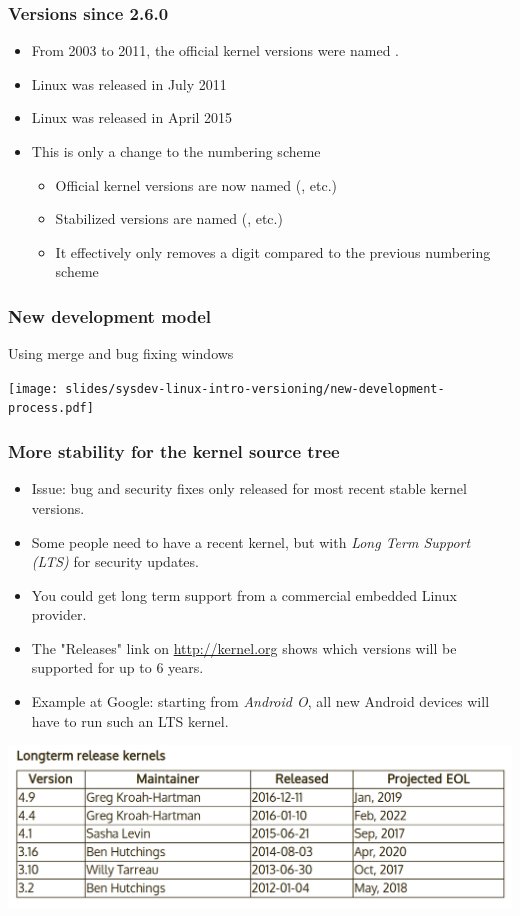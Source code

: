 \begin{frame}
  \frametitle{Versions since 2.6.0}
  \begin{itemize}
  \item From 2003 to 2011, the official kernel versions were named .
  \item Linux  was released in July 2011
  \item Linux  was released in April 2015
  \item This is only a change to the numbering scheme
    \begin{itemize}
    \item Official kernel versions are now named 
      (, etc.)
    \item Stabilized versions are named 
      (, etc.)
    \item It effectively only removes a digit compared to the previous
      numbering scheme
    \end{itemize}
  \end{itemize}
\end{frame}

\begin{frame}
  \frametitle{New development model}
  Using merge and bug fixing windows
  \begin{center}
    \texttt{[image: slides/sysdev-linux-intro-versioning/new-development-process.pdf]}
  \end{center}
\end{frame}

\begin{frame}
  \frametitle{More stability for the kernel source tree}
  \begin{itemize}
  \item Issue: bug and security fixes only released for most recent
    stable kernel versions.
  \item Some people need to have a recent kernel, but with {\em Long Term
    Support (LTS)} for security updates.
  \item You could get long term support from a commercial embedded
    Linux provider.
  \item The "Releases" link on \url{http://kernel.org}
    shows which versions will be supported for up to 6 years.
  \item Example at Google: starting from {\em Android O}, all new Android devices will
    have to run such an LTS kernel.
  \end{itemize}
  \includegraphics[height=0.3\textheight]{slides/sysdev-linux-intro-versioning/longterm-release-kernels.png}
\end{frame}

